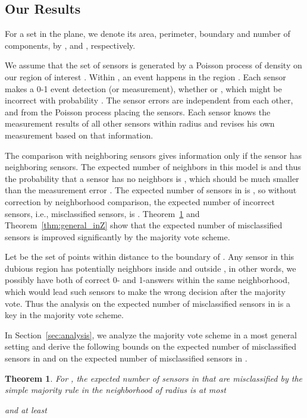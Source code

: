 \documentclass{article}
\newtheorem{theorem}{Theorem}
\begin{document}
\subsection{Our Results}

For a set  in the plane, we denote its area, perimeter, boundary and number of components, by ,  and , respectively.

\par
We assume that the set  of sensors is generated by a Poisson process of density  on our region of interest . Within , an event happens in the region . Each sensor  makes a 0-1 event detection (or measurement), whether  or , which might be incorrect with probability . The sensor errors are independent from each other, and from the Poisson process placing the sensors. Each sensor knows the measurement results of all other sensors within radius  and revises his own measurement based on that information.

\par
The comparison with neighboring sensors gives information only if the sensor has neighboring sensors. The expected number of neighbors in this model is  and thus the probability that a sensor has no neighbors is , which should be much smaller than the measurement error . The expected number of sensors in  is , so without correction by neighborhood comparison, the expected number of incorrect sensors, i.e., misclassified sensors, is . Theorem~\ref{thm:general_outZ} and Theorem~\ref{thm:general_inZ} show that the expected number of misclassified sensors is improved significantly by the majority vote scheme.

\par
Let  be the set of points within distance  to the boundary of . Any sensor in this dubious region  has potentially neighbors inside and outside , in other words, we possibly have both of correct 0- and 1-answers within the same neighborhood, which would lead such sensors to make the wrong decision after the majority vote. Thus the analysis on the expected number of misclassified sensors in  is a key in the majority vote scheme.

In Section~\ref{sec:analysis}, we analyze the majority vote scheme in a most general setting and derive the following bounds on the expected number of misclassified sensors in  and on the expected number of misclassified sensors in .
\begin{theorem}\label{thm:general_outZ}
For , the expected number of sensors in  that are misclassified by the simple majority rule in the neighborhood of radius  is at most

and at least

\end{theorem}
\end{document}

